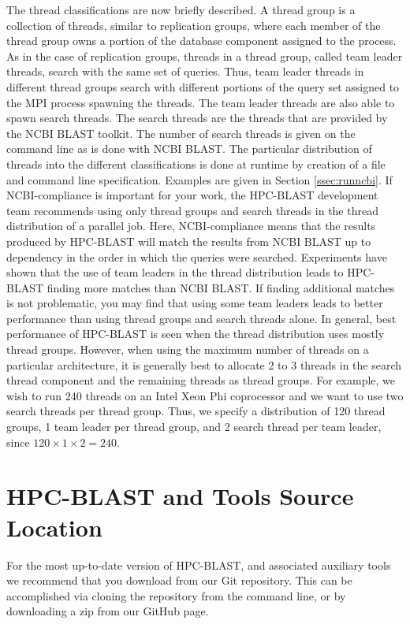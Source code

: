 \documentclass[10pt]{article}
\begin{document}
The thread classifications are now briefly described.  A thread group is a collection of threads, similar to replication groups, where each member of the thread group owns a portion of the database component assigned to the process.
As in the case of replication groups, threads in a thread group, called team leader threads, search with the same set of queries.  Thus, team leader threads in different thread groups search with different portions of the query set
assigned to the MPI process spawning the threads. The team leader threads are also able to spawn search threads.  The search threads are the threads that are provided by the NCBI BLAST toolkit.  The number of search threads
is given on the command line as is done with NCBI BLAST.  The particular distribution of threads into the different classifications is done at runtime by creation of a file and command line specification.  Examples are given in Section
\ref{ssec:runncbi}.  If NCBI-compliance is important for your work, the HPC-BLAST development team recommends using only thread groups and search threads in the thread distribution of a parallel job.  Here, NCBI-compliance
means that the results produced by HPC-BLAST will match the results from NCBI BLAST up to dependency in the order in which the queries were searched.  Experiments have shown that the use of team leaders in the thread
distribution leads to HPC-BLAST finding more matches than NCBI BLAST.  If finding additional matches is not problematic, you may find that using some team leaders leads to better performance than using thread groups and
search threads alone. In general, best performance of HPC-BLAST is seen when the thread distribution uses mostly thread groups.  However, when using the maximum number of threads on a particular architecture, it is generally
best to allocate 2 to 3 threads in the search thread component and the remaining threads as thread groups.  For example, we wish to run 240 threads on an Intel Xeon Phi coprocessor and we want to use two search threads per
thread group.  Thus, we specify a distribution of 120 thread groups, 1 team leader per thread group, and 2 search thread per team leader, since \(120 \times 1 \times 2 = 240\).

\clearpage

\section{HPC-BLAST and Tools Source Location} \label{sec:src}

For the most up-to-date version of HPC-BLAST, 
and associated auxiliary tools we recommend that you
download from our Git repository. This can be accomplished via
cloning the repository from the command line, or by downloading a zip
from our GitHub page.   
\end{document}
